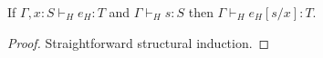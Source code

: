 \begin{lemma}
\label{htms}
If $\Gamma,x:S\vdash_{H}e_{H}:T$ and $\Gamma\vdash_{H}s:S$ then $\Gamma\vdash_{H}e_{H}[s/x]:T$.
\begin{proof}
Straightforward structural induction.
\end{proof}
\end{lemma}